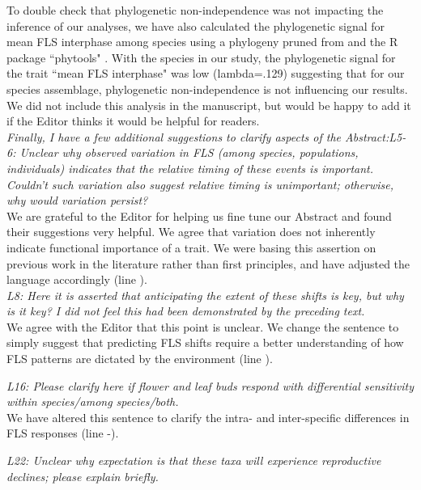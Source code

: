 \documentclass[11pt]{article}
\begin{document}
\noindent To double check that phylogenetic non-independence was not impacting the inference of our analyses, we have also calculated the phylogenetic signal for mean FLS interphase among species using a phylogeny pruned from \citet{Zanne2013} and the R package ``phytools" \citep{Revell2012}. With the species in our study, the phylogenetic signal for the trait ``mean FLS interphase" was low (lambda=.129) suggesting that for our species assemblage, phylogenetic non-independence is not influencing our results. We did not include this analysis in the manuscript, but would be happy to add it if the Editor thinks it would be helpful for readers.\\

\emph{Finally, I have a few additional suggestions to clarify aspects of the Abstract:L5-6: Unclear why observed variation in FLS (among species, populations, individuals) indicates that the relative timing of these events is important. Couldn't such variation also suggest relative timing is unimportant; otherwise, why would variation persist?}\\

\noident We are grateful to the Editor for helping us fine tune our Abstract and found their suggestions very helpful. We agree that variation does not inherently indicate functional importance of a trait. We were basing this assertion on previous work in the literature rather than first principles, and have adjusted the language accordingly (line ).\\

\emph{L8: Here it is asserted that anticipating the extent of these shifts is key, but why is it key? I did not feel this had been demonstrated by the preceding text.}\\

We agree with the Editor that this point is unclear. We change the sentence to simply suggest that predicting FLS shifts require a better understanding of how FLS patterns are dictated by the environment (line ).

\emph{L16: Please clarify here if flower and leaf buds respond with differential sensitivity within species/among species/both.}\\

\noindent We have altered this sentence to clarify the intra- and inter-specific differences in FLS responses (line -).

\emph{L22: Unclear why expectation is that these taxa will experience reproductive declines; please explain briefly.}\\
 
\end{document}
